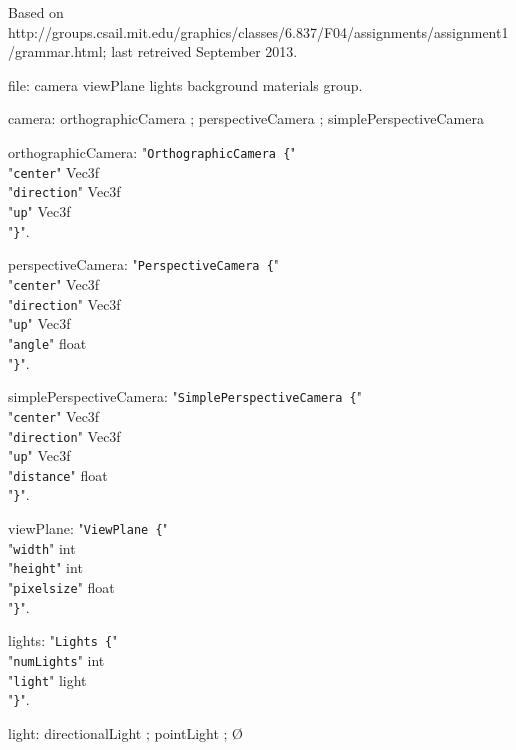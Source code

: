 \documentclass[twoside]{article}
\begin{document}
Based on\\ \small{http://groups.csail.mit.edu/graphics/classes/6.837/F04/assignments/assignment1/grammar.html}; last retreived September 2013.

\begin{grammar}
file: camera viewPlane lights background materials group.

camera: orthographicCamera ; perspectiveCamera ; simplePerspectiveCamera

orthographicCamera: "\verb!OrthographicCamera {!"\\
    "\verb!center!" Vec3f\\
    "\verb!direction!" Vec3f\\
    "\verb!up!" Vec3f\\
"\verb!}!".

perspectiveCamera: "\verb!PerspectiveCamera {!"\\
    "\verb!center!" Vec3f\\
    "\verb!direction!" Vec3f\\
    "\verb!up!" Vec3f\\
    "\verb!angle!" float\\
"\verb!}!".

simplePerspectiveCamera: "\verb!SimplePerspectiveCamera {!"\\
    "\verb!center!" Vec3f\\
    "\verb!direction!" Vec3f\\
    "\verb!up!" Vec3f\\
    "\verb!distance!" float\\
"\verb!}!".

viewPlane: "\verb!ViewPlane {!"\\
    "\verb!width!" int\\
    "\verb!height!" int\\
    "\verb!pixelsize!" float\\
"\verb!}!".

lights: "\verb!Lights {!"\\
    "\verb!numLights!" int\\
    "\verb!light!" light\\
"\verb!}!".

light: directionalLight ; pointLight ; \O


\end{grammar}
\end{document}
